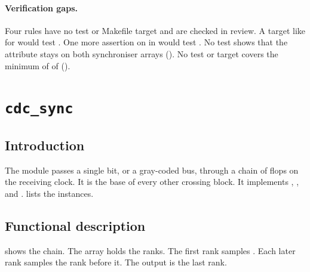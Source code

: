 \paragraph{Verification gaps.} Four rules have no test or Makefile target and are checked in review. A target like  for  would test . One more assertion on  in  would test . No test shows that the attribute  stays on both synchroniser arrays (). No test or target covers the minimum of  of  ().

\section{\texttt{cdc\_sync}}\label{tm:mod:cdc-sync}

\subsection{Introduction}
The module  passes a single bit, or a gray-coded bus, through a chain of  flops on the receiving clock. It is the base of every other crossing block. It implements , ,  and .  lists the instances.

\subsection{Functional description}
 shows the chain. The array  holds the ranks. The first rank samples . Each later rank samples the rank before it. The output  is the last rank.

